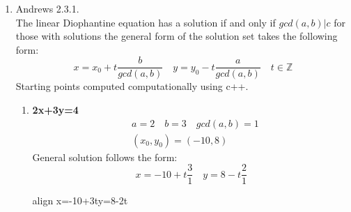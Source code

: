 \documentclass[11pt]{article}
\def\Z{\mathbb{Z}}
\newcommand\setItemnumber[1]{\setcounter{enumi}{\numexpr#1-1\relax}}
\newcommand{\boxedeq}[2]{\begin{empheq}[box={\fboxsep=6pt\fbox}]{align}\label{#1}#2\end{empheq}}
\begin{document}
\begin{enumerate}
\begin{proof}
\begin{proof}
           \\\\
           Let $e|a$ and $e|b$ then by the definition of divisibility:
           \begin{align*}
            &a=ek,k\in \Z\\
            &b=el,l\in \Z\\
            &S_{\min}=am^*+bn^*\\
            &S_{\min}=ekm^*+eln^*\\
            &S_{\min}=e(km^*+ln^*)\\
            &e|S_{\min}
           \end{align*}
           So it is shown that $S_{\min}=gcd(a,b)$
         \end{proof}
         If $S_{\min}=gcd(a,b)$ then since $gcd(a,b)|c$, $S_{\min}|c$ which implies:
        \begin{align*}
          &c=S_{\min}k,k\in \Z\\
          &c=(am^*+bn^*)k\\
          &c=am^*k+bn^*k\\
          &c=a(m^*k)+b(n^*k)\\
        \end{align*}
        So we have shown the existence of integer multiples x and y such that c=ax+by
    \end{proof}
  \textbf{If ax+by=c then gcd(a,b)|c}\\\\
    Let d=gcd(a,b) then by the definition of gcd $d|a$ and $d|b$. This implies:
   \[
       c=(dk)x+(dl)y=d(kx+ly),\quad k,l\in \Z
   \]
    Hence, d|c.
  \setItemnumber{8}
  \item Andrews 2.3.1.\\
  The linear Diophantine equation has a solution if and only if $gcd(a,b)|c$ for those with solutions the general form of the solution set takes the following form:
  \[
    x=x_0+t\frac{b}{gcd(a,b)}\quad y=y_0-t\frac{a}{gcd(a,b)}\quad t\in \Z
  \]
  Starting points computed computationally using c++.
    \begin{enumerate}
        \item \textbf{2x+3y=4}
        \begin{align*}
         &a=2 \quad b=3\quad gcd(a,b)=1\\
         &(x_0,y_0)=(-10,8)
        \end{align*}
        General solution follows the form:
        \[
           x=-10+t\frac{3}{1}\quad y=8-t\frac{2}{1}
        \]
        \boxedeq{}{ x=-10+3t\quad y=8-2t }


\end{enumerate}
\end{enumerate}
\end{document}
